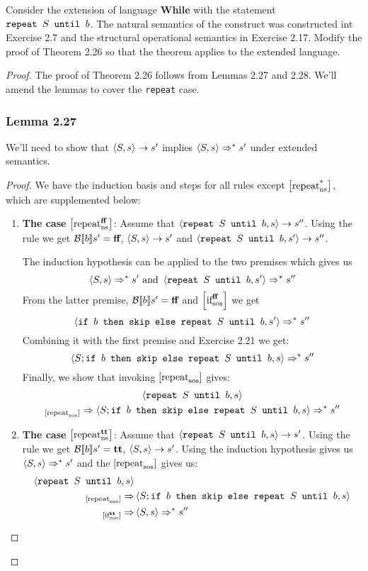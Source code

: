 Consider the extension of language \textbf{While} with the statement $\srepeat{S}{b}$. The natural semantics of the construct was constructed int Exercise 2.7 and the structural operational semantics in Exercise 2.17. Modify the proof of Theorem 2.26 so that the theorem applies to the extended language.
\begin{proof}
The proof of Theorem 2.26  follows from Lemmas 2.27 and 2.28. We'll amend the lemmas to cover the \texttt{repeat} case.
\subsubsection*{Lemma 2.27}
We'll need to show that $\nstrans{S}{s}{s^\prime}$ implies $\sosftrans[*]{S}{s}{s^\prime}$ under extended semantics.
\begin{proof}
We have the induction basis and steps for all rules except $\nsrule[*]{repeat}$, which are supplemented below:
\begin{enumerate}
	\item \textbf{The case} $\nsrule[\false]{repeat}$: Assume that $\nstrans{\srepeat{S}{b}}{s}{s^\pprime}$.
	Using the rule we get $\beval{b}{s^\prime}=\false$, $\nstrans{S}{s}{s^\prime}$ and $\nstrans{\srepeat{S}{b}}{s^\prime}{s^\pprime}$.

	The induction hypothesis can be applied to the two premises which gives us
	\begin{equation*}
		\sosftrans[*]{S}{s}{s^\prime} \text{ and } \sosftrans[*]{\srepeat{S}{b}}{s^\prime}{s^\pprime}
	\end{equation*}
	From the latter premise, $\beval{b}{s^\prime}=\false$ and $\sosrule[\false]{if}$ we get
	\begin{equation*}
		\sosftrans[*]{\sif{b}{\sskip}{\srepeat{S}{b}}}{s^\prime}{s^\pprime}
	\end{equation*}
	Combining it with the first premise and Exercise 2.21 we get:
	\begin{equation*}
		\sosftrans[*]{S;\sif{b}{\sskip}{\srepeat{S}{b}}}{s}{s^\pprime}
	\end{equation*}
	Finally, we show that invoking $\sosrule{repeat}$ gives:
	\begin{multline*}
		\state{\srepeat{S}{b}}{s} \\ {}_{\sosrule{repeat}}\Rightarrow  \sosftrans[*]{S;\sif{b}{\sskip}{\srepeat{S}{b}}}{s}{s^\pprime}
	\end{multline*}
	\item \textbf{The case} $\nsrule[\true]{repeat}$: Assume that $\nstrans{\srepeat{S}{b}}{s}{s^\prime}$.
	Using the rule we get $\beval{b}{s^\prime}=\true$, $\nstrans{S}{s}{s^\prime}$. Using the induction hypothesis gives us $\sosftrans[*]{S}{s}{s^\prime}$ and the $\sosrule{repeat}$ gives us:
	\begin{align*}
		\state{\srepeat{S}{b}}{s} & \\
		{}_{\sosrule{repeat}}\Rightarrow & \state{S;\sif{b}{\sskip}{\srepeat{S}{b}}}{s}  \\ 
		{}_{\sosrule[\true]{if}}\Rightarrow &	\sosftrans[*]{S}{s}{s^\pprime}
	\end{align*}
\end{enumerate}
\end{proof}

\end{proof}
